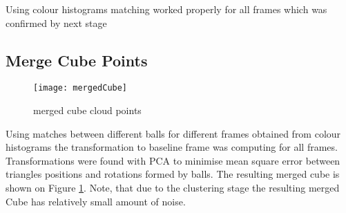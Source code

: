 \documentclass[a4paper,11pt]{article}
\theoremstyle{mytheor}
\begin{document}
Using colour histograms matching worked properly for all frames which was confirmed by next stage

\subsection{Merge Cube Points}

\begin{figure}[htbp!]
    \centering
    \texttt{[image: mergedCube]}
    \caption{merged cube cloud points}
    \label{fig:mergedCube}
\end{figure}

Using matches between different balls for different frames obtained from colour histograms the transformation to baseline frame was computing for all frames. Transformations were found with PCA to minimise mean square error between triangles positions and rotations formed by balls. The resulting merged cube is shown on Figure \ref{fig:mergedCube}. Note, that due to the clustering stage the resulting merged Cube has relatively small amount of noise.




\printbibliography[
    heading=bibintoc,
    title={References}
    ] %
    
\end{document}
